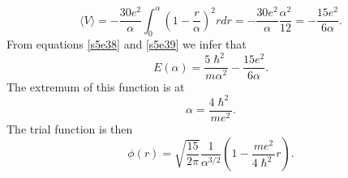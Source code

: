 \documentclass{article}
\numberwithin{equation}{section}
\begin{document}
\begin{equation}\label{s5e39}
\langle V \rangle = -\frac{30e^2}{\alpha}\int_0^\alpha
\left(1-\frac{r}{\alpha}\right)^2 rdr = -\frac{30 e^2}{\alpha}
\frac{\alpha^2}{12} = -\frac{15 e^2}{6\alpha}.
\end{equation}
From equations \eqref{s5e38} and \eqref{s5e39} we infer that
\begin{equation}\label{s5e40}
E(\alpha) = \frac{5\hslash^2}{m\alpha^2} - \frac{15e^2}{6\alpha}.
\end{equation}
The extremum of this function is at
\begin{equation}\label{s5e41}
\alpha = \frac{4\hslash^2}{me^2}.
\end{equation}
The trial function is then
\begin{equation}\label{s5e42}
\phi(r) = \sqrt{\frac{15}{2\pi}}\frac{1}{\alpha^{3/2}}\left(1 - 
\frac{me^2}{4\hslash^2}r\right).
\end{equation}
\end{document}
